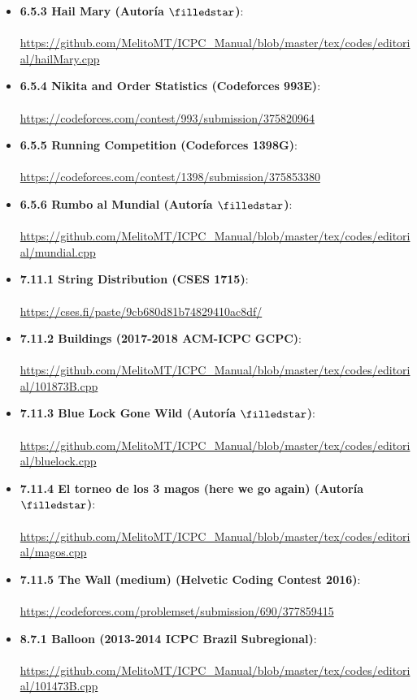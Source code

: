 \begin{itemize}
    \item \textbf{6.5.3 Hail Mary (Autoría $\filledstar$)}:
    \\\\ \url{https://github.com/MelitoMT/ICPC_Manual/blob/master/tex/codes/editorial/hailMary.cpp}
    \item \textbf{6.5.4 Nikita and Order Statistics (Codeforces 993E)}:
    \\\\ \url{https://codeforces.com/contest/993/submission/375820964}
    \item \textbf{6.5.5 Running Competition (Codeforces 1398G)}:
    \\\\ \url{https://codeforces.com/contest/1398/submission/375853380}
    \item \textbf{6.5.6 Rumbo al Mundial (Autoría $\filledstar$)}:
    \\\\ \url{https://github.com/MelitoMT/ICPC_Manual/blob/master/tex/codes/editorial/mundial.cpp}
    \item \textbf{7.11.1 String Distribution (CSES 1715)}:
    \\\\ \url{https://cses.fi/paste/9cb680d81b74829410ac8df/}
    \item \textbf{7.11.2 Buildings (2017-2018 ACM-ICPC GCPC)}:
    \\\\ \url{https://github.com/MelitoMT/ICPC_Manual/blob/master/tex/codes/editorial/101873B.cpp}
    \item \textbf{7.11.3 Blue Lock Gone Wild (Autoría $\filledstar$)}:
    \\\\ \url{https://github.com/MelitoMT/ICPC_Manual/blob/master/tex/codes/editorial/bluelock.cpp}
    \item \textbf{7.11.4 El torneo de los 3 magos (here we go again) (Autoría $\filledstar$)}:
    \\\\ \url{https://github.com/MelitoMT/ICPC_Manual/blob/master/tex/codes/editorial/magos.cpp}
    \item \textbf{7.11.5 The Wall (medium) (Helvetic Coding Contest 2016)}:
    \\\\ \url{https://codeforces.com/problemset/submission/690/377859415}
    \item \textbf{8.7.1 Balloon (2013-2014 ICPC Brazil Subregional)}:
    \\\\ \url{https://github.com/MelitoMT/ICPC_Manual/blob/master/tex/codes/editorial/101473B.cpp}

\end{itemize}
